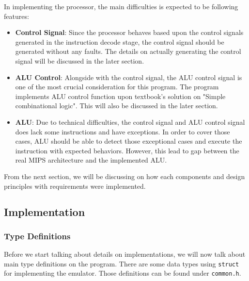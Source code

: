 \documentclass{homework}
\begin{document}
In implementing the processor, the main difficulties is expected to be following features:
\begin{itemize}
    \item \textbf{Control Signal}: Since the processor behaves based upon the control signals generated in the instruction decode stage, the control signal should be generated without any faults. The details on actually generating the control signal will be discussed in the later section.
    \item \textbf{ALU Control}: Alongside with the control signal, the ALU control signal is one of the most crucial consideration for this program. The program implements ALU control function upon textbook's solution on "Simple combinational logic". This will also be discussed in the later section.
    \item \textbf{ALU}: Due to technical difficulties, the control signal and ALU control signal does lack some instructions and have exceptions. In order to cover those cases, ALU should be able to detect those exceptional cases and execute the instruction with expected behaviors. However, this lead to gap between the real MIPS architecture and the implemented ALU. 
\end{itemize}
From the next section, we will be discussing on how each components and design principles with requirements were implemented.

\pagebreak
\subsection{Implementation}
\subsubsection{Type Definitions}
Before we start talking about details on implementations, we will now talk about main type definitions on the program. There are some data types using \texttt{struct} for implementing the emulator. Those definitions can be found under \texttt{common.h}.
\end{document}
